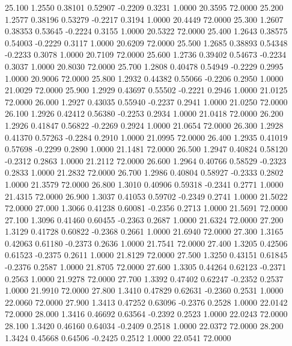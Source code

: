   25.100   1.2550   0.38101   0.52907  -0.2209   0.3231   1.0000  20.3595  72.0000
  25.200   1.2577   0.38196   0.53279  -0.2217   0.3194   1.0000  20.4449  72.0000
  25.300   1.2607   0.38353   0.53645  -0.2224   0.3155   1.0000  20.5322  72.0000
  25.400   1.2643   0.38575   0.54003  -0.2229   0.3117   1.0000  20.6209  72.0000
  25.500   1.2685   0.38893   0.54348  -0.2233   0.3078   1.0000  20.7109  72.0000
  25.600   1.2736   0.39402   0.54673  -0.2234   0.3037   1.0000  20.8030  72.0000
  25.700   1.2808   0.40478   0.54949  -0.2229   0.2995   1.0000  20.9006  72.0000
  25.800   1.2932   0.44382   0.55066  -0.2206   0.2950   1.0000  21.0029  72.0000
  25.900   1.2929   0.43697   0.55502  -0.2221   0.2946   1.0000  21.0125  72.0000
  26.000   1.2927   0.43035   0.55940  -0.2237   0.2941   1.0000  21.0250  72.0000
  26.100   1.2926   0.42412   0.56380  -0.2253   0.2934   1.0000  21.0418  72.0000
  26.200   1.2926   0.41847   0.56822  -0.2269   0.2924   1.0000  21.0654  72.0000
  26.300   1.2928   0.41370   0.57263  -0.2284   0.2910   1.0000  21.0995  72.0000
  26.400   1.2935   0.41019   0.57698  -0.2299   0.2890   1.0000  21.1481  72.0000
  26.500   1.2947   0.40824   0.58120  -0.2312   0.2863   1.0000  21.2112  72.0000
  26.600   1.2964   0.40766   0.58529  -0.2323   0.2833   1.0000  21.2832  72.0000
  26.700   1.2986   0.40804   0.58927  -0.2333   0.2802   1.0000  21.3579  72.0000
  26.800   1.3010   0.40906   0.59318  -0.2341   0.2771   1.0000  21.4315  72.0000
  26.900   1.3037   0.41053   0.59702  -0.2349   0.2741   1.0000  21.5022  72.0000
  27.000   1.3066   0.41238   0.60081  -0.2356   0.2713   1.0000  21.5691  72.0000
  27.100   1.3096   0.41460   0.60455  -0.2363   0.2687   1.0000  21.6324  72.0000
  27.200   1.3129   0.41728   0.60822  -0.2368   0.2661   1.0000  21.6940  72.0000
  27.300   1.3165   0.42063   0.61180  -0.2373   0.2636   1.0000  21.7541  72.0000
  27.400   1.3205   0.42506   0.61523  -0.2375   0.2611   1.0000  21.8129  72.0000
  27.500   1.3250   0.43151   0.61845  -0.2376   0.2587   1.0000  21.8705  72.0000
  27.600   1.3305   0.44264   0.62123  -0.2371   0.2563   1.0000  21.9278  72.0000
  27.700   1.3392   0.47402   0.62247  -0.2352   0.2537   1.0000  21.9910  72.0000
  27.800   1.3410   0.47829   0.62631  -0.2360   0.2531   1.0000  22.0060  72.0000
  27.900   1.3413   0.47252   0.63096  -0.2376   0.2528   1.0000  22.0142  72.0000
  28.000   1.3416   0.46692   0.63564  -0.2392   0.2523   1.0000  22.0243  72.0000
  28.100   1.3420   0.46160   0.64034  -0.2409   0.2518   1.0000  22.0372  72.0000
  28.200   1.3424   0.45668   0.64506  -0.2425   0.2512   1.0000  22.0541  72.0000
